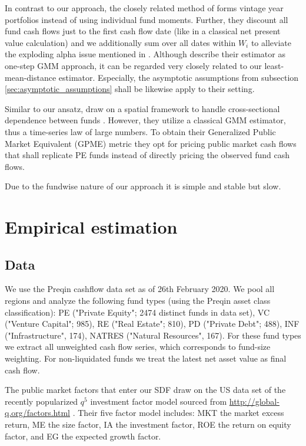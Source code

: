 \documentclass[12pt]{article}
\begin{document}
In contrast to our approach, the closely related method of \cite{DLP12} forms vintage year portfolios instead of using individual fund moments.
Further, they discount all fund cash flows just to the first cash flow date (like in a classical net present value calculation) and we additionally sum over all dates within $W_{i}$ to alleviate the exploding alpha issue mentioned in \cite{DLP12}.
Although \cite{DLP12} describe their estimator as one-step GMM approach, it can be regarded very closely related to our least-mean-distance estimator.
Especially, the asymptotic assumptions from subsection \ref{sec:asymptotic_assumptions} shall be likewise apply to their setting.

Similar to our ansatz, \cite{KN16} draw on a spatial framework to handle cross-sectional dependence between funds \citep{C99}.
However, they utilize a classical GMM estimator, thus a time-series law of large numbers.
To obtain their Generalized Public Market Equivalent (GPME) metric they opt for pricing public market cash flows that shall replicate PE funds instead of directly pricing the observed fund cash flows.

Due to the fundwise nature of our approach it is simple and stable but slow.


\section{Empirical estimation}

\subsection{Data}

We use the Preqin cashflow data set as of 26th February 2020.
We pool all regions and analyze the following fund types (using the Preqin asset class classification):
PE ("Private Equity"; 2474 distinct funds in data set),
VC ("Venture Capital"; 985),
RE ("Real Estate"; 810),
PD ("Private Debt"; 488),
INF ("Infrastructure", 174), 
NATRES ("Natural Resources", 167).
For these fund types we extract all unweighted cash flow series, which corresponds to fund-size weighting.
For non-liquidated funds we treat the latest net asset value as final cash flow.

The public market factors that enter our SDF draw on the US data set of the recently popularized $q^5$ investment factor model sourced from \url{http://global-q.org/factors.html} \citep{HXZ15,HXZ20}. 
Their five factor model includes: MKT the market excess return, ME the size factor, IA the investment factor, ROE the return on equity factor, and EG the expected growth factor.
\end{document}
